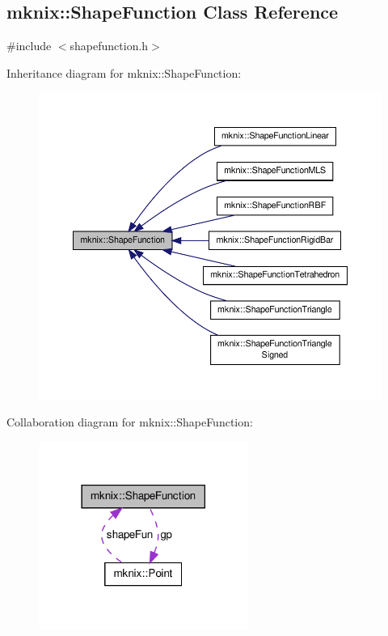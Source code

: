 \hypertarget{classmknix_1_1_shape_function}{\subsection{mknix\-:\-:Shape\-Function Class Reference}
\label{classmknix_1_1_shape_function}
}


{\ttfamily \#include $<$shapefunction.\-h$>$}



Inheritance diagram for mknix\-:\-:Shape\-Function\-:\nopagebreak
\begin{figure}[H]
\begin{center}
\leavevmode
\includegraphics[width=350pt]{d2/de3/classmknix_1_1_shape_function__inherit__graph}
\end{center}
\end{figure}


Collaboration diagram for mknix\-:\-:Shape\-Function\-:\nopagebreak
\begin{figure}[H]
\begin{center}
\leavevmode
\includegraphics[width=194pt]{d6/d56/classmknix_1_1_shape_function__coll__graph}
\end{center}
\end{figure}
